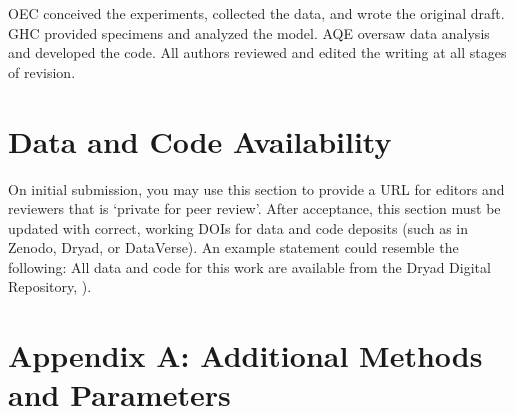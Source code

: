 \documentclass[11pt]{article}
\begin{document}
OEC conceived the experiments, collected the data, and wrote the original draft.
GHC provided specimens and analyzed the model.
AQE oversaw data analysis and developed the code. 
All authors reviewed and edited the writing at all stages of revision.

\section*{Data and Code Availability}

On initial submission, you may use this section to provide a URL for editors and reviewers that is `private for peer review'. After acceptance, this section must be updated with correct, working DOIs for data and code deposits (such as in Zenodo, Dryad, or DataVerse). An example statement could resemble the following: All data and code for this work are available from the Dryad Digital Repository, \citealt{CookEtAl2015}). 

\section*{Appendix A: Additional Methods and Parameters}

%
% 
%
%
%
%

\renewcommand{\theequation}{A\arabic{equation}}
\renewcommand{\thetable}{A\arabic{table}}
\setcounter{equation}{0}  %
\setcounter{figure}{0}
\setcounter{table}{0}
\end{document}
